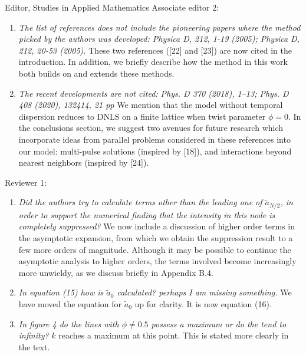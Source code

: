 \documentclass[11pt]{letter}
\begin{document}
\begin{letter}{Editor, Studies in Applied Mathematics}
Associate editor 2:
\begin{enumerate}
    \item \emph{The list of references does not include the pioneering papers where the method picked by the authors was developed: Physica D, 212, 1-19 (2005); Physica D, 212, 20-53 (2005).} These two references ([22] and [23]) are now cited in the introduction. In addition, we briefly describe how the method in this work both builds on and extends these methods.
    \vspace{4mm}

    \item \emph{The recent developments are not cited: Phys. D 370 (2018), 1–13;  Phys. D 408 (2020), 132414, 21 pp} We mention that the model without temporal dispersion reduces to DNLS on a finite lattice when twist parameter $\phi = 0$. In the conclusions section, we suggest two avenues for future research which incorporate ideas from parallel problems considered in these references into our model: multi-pulse solutions (inspired by [18]), and interactions beyond nearest neighbors (inspired by [24]).
    \vspace{4mm}
\end{enumerate}

Reviewer 1:
\begin{enumerate}
    \item \emph{Did the authors try to calculate terms other than the leading one of $\tilde{a}_{N/2}$, in order to support the numerical finding that the intensity in this node is completely suppressed?} We now include a discussion of higher order terms in the asymptotic expansion, from which we obtain the suppression result to a few more orders of magnitude. Although it may be possible to continue the asymptotic analysis to higher orders, the terms involved become increasingly more unwieldy, as we discuss briefly in Appendix B.4.
    \vspace{4mm}

    \item \emph{In equation (15) how is $\tilde{a}_0$ calculated? perhaps I am missing something.} We have moved the equation for $\tilde{a}_0$ up for clarity. It is now equation (16). 
    \vspace{4mm}

    \item \emph{In figure 4 do the lines with $\phi\neq0.5$ possess a maximum or do the tend to infinity?} $k$ reaches a maximum at this point. This is stated more clearly in the text.
    \vspace{4mm}


\end{enumerate}
\end{letter}
\end{document}
